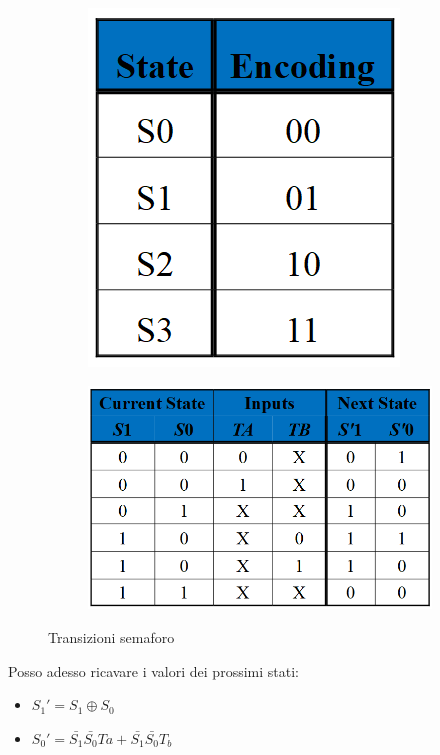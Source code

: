 \documentclass{article}
\begin{document}
    \begin{figure}[ht]
    \begin{minipage}[t]{0.49\textwidth}
        \centering
        \begin{figure}[H]
        \centering
        \includegraphics[width=.55\linewidth]{semaforo_cod.png}
        \end{figure}
        \label{fig:semaforo_cod}
    \end{minipage}
    \begin{minipage}[t]{0.49\textwidth}
    \centering
    \begin{figure}[H]
    \centering
    \includegraphics[width=\linewidth]{semaforo_trans.png}
    \end{figure}
    \label{fig:semaforo_trans}
    \end{minipage}
    \caption{Transizioni semaforo}
    \end{figure}

Posso adesso ricavare i valori dei prossimi stati:
\begin{itemize}
    \item $S_1'=S_1\oplus S_0$
    \item $S_0'=\bar{S_1}\bar{S_0}Ta+\bar{S_1}\bar{S_0}T_b$
\end{itemize}
\end{document}
